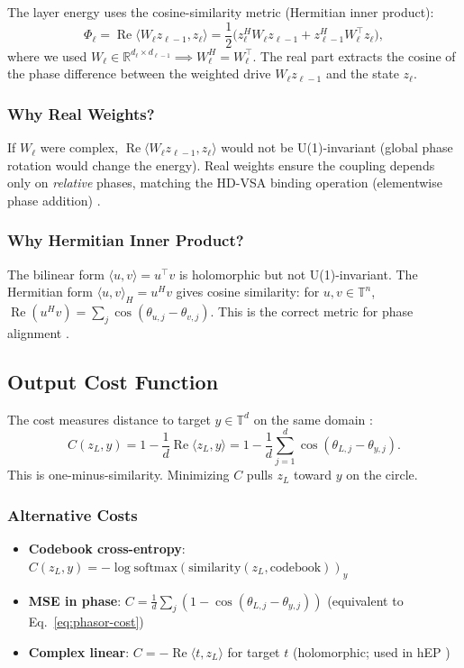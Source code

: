 \documentclass[11pt]{article}
\newcommand{\R}{\mathbb{R}}
\newcommand{\T}{\mathbb{T}}
\DeclareMathOperator{\Real}{Re}
\begin{document}
The layer energy uses the cosine-similarity metric (Hermitian inner product):
\begin{equation}\label{eq:layer-energy}
\Phi_\ell = \Real\langle W_\ell z_{\ell-1}, z_\ell \rangle
= \frac{1}{2}\big( z_\ell^H W_\ell z_{\ell-1} + z_{\ell-1}^H W_\ell^\top z_\ell \big),
\end{equation}
where we used $W_\ell \in \R^{d_\ell \times d_{\ell-1}} \implies W_\ell^H = W_\ell^\top$. The real part extracts the cosine of the phase difference between the weighted drive $W_\ell z_{\ell-1}$ and the state $z_\ell$.

\subsubsection{Why Real Weights?}
If $W_\ell$ were complex, $\Real\langle W_\ell z_{\ell-1}, z_\ell \rangle$ would not be U(1)-invariant (global phase rotation would change the energy). Real weights ensure the coupling depends only on \emph{relative} phases, matching the HD-VSA binding operation (elementwise phase addition) \citep{olin2023hyperdimensional}.

\subsubsection{Why Hermitian Inner Product?}
The bilinear form $\langle u, v \rangle = u^\top v$ is holomorphic but not U(1)-invariant. The Hermitian form $\langle u, v \rangle_H = u^H v$ gives cosine similarity: for $u,v \in \T^n$, $\Real(u^H v) = \sum_j \cos(\theta_{u,j} - \theta_{v,j})$. This is the correct metric for phase alignment \citep{olin2021deep}.

\subsection{Output Cost Function}

The cost measures distance to target $y \in \T^d$ on the same domain \citep{olin2021deep}:
\begin{equation}\label{eq:phasor-cost}
C(z_L, y) = 1 - \frac{1}{d}\Real\langle z_L, y \rangle
= 1 - \frac{1}{d}\sum_{j=1}^d \cos(\theta_{L,j} - \theta_{y,j}).
\end{equation}
This is one-minus-similarity. Minimizing $C$ pulls $z_L$ toward $y$ on the circle.

\subsubsection{Alternative Costs}
\begin{itemize}
\item \textbf{Codebook cross-entropy}: $C(z_L, y) = -\log \mathrm{softmax}(\mathrm{similarity}(z_L, \text{codebook}))_y$ \citep{olin2021deep}
\item \textbf{MSE in phase}: $C = \frac{1}{d}\sum_j (1 - \cos(\theta_{L,j} - \theta_{y,j}))$ (equivalent to Eq.~\ref{eq:phasor-cost})
\item \textbf{Complex linear}: $C = -\Real\langle t, z_L \rangle$ for target $t$ (holomorphic; used in hEP \citep{laborieux2022holomorphic})
\end{itemize}
\end{document}
